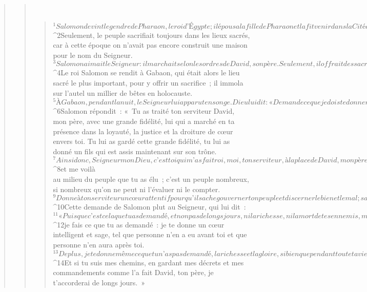 \begin{verse}
\begin{verse}
         
      \bchapter{}
      \begin{verse}
${}^{1}Salomon devint le gendre de Pharaon, le roi d’Égypte ; il épousa la fille de Pharaon et la fit venir dans la Cité de David, en attendant d’avoir achevé la construction de sa propre maison, de la maison du Seigneur et du mur d’enceinte de Jérusalem. 
${}^{2}Seulement, le peuple sacrifiait toujours dans les lieux sacrés, car à cette époque on n’avait pas encore construit une maison pour le nom du Seigneur. 
${}^{3}Salomon aimait le Seigneur : il marchait selon les ordres de David, son père. Seulement, il offrait des sacrifices dans les lieux sacrés, et y brûlait de l’encens.
      
         
${}^{4}Le roi Salomon se rendit à Gabaon, qui était alors le lieu sacré le plus important, pour y offrir un sacrifice ; il immola sur l’autel un millier de bêtes en holocauste. 
${}^{5}À Gabaon, pendant la nuit, le Seigneur lui apparut en songe. Dieu lui dit : « Demande ce que je dois te donner. » 
${}^{6}Salomon répondit : « Tu as traité ton serviteur David, mon père, avec une grande fidélité, lui qui a marché en ta présence dans la loyauté, la justice et la droiture de cœur envers toi. Tu lui as gardé cette grande fidélité, tu lui as donné un fils qui est assis maintenant sur son trône. 
${}^{7}Ainsi donc, Seigneur mon Dieu, c’est toi qui m’as fait roi, moi, ton serviteur, à la place de David, mon père ; or, je suis un tout jeune homme, ne sachant comment se comporter, 
${}^{8}et me voilà\\au milieu du peuple que tu as élu ; c’est un peuple nombreux, si nombreux qu’on ne peut ni l’évaluer ni le compter. 
${}^{9}Donne à ton serviteur un cœur attentif pour qu’il sache gouverner ton peuple et discerner le bien et le mal ; sans cela, comment gouverner ton peuple, qui est si important ? » 
${}^{10}Cette demande de Salomon plut au Seigneur, qui lui dit : 
${}^{11}« Puisque c’est cela que tu as demandé, et non pas de longs jours, ni la richesse, ni la mort de tes ennemis, mais puisque tu as demandé le discernement, l’art d’être attentif et de gouverner, 
${}^{12}je fais ce que tu as demandé : je te donne un cœur intelligent et sage, tel que personne n’en a eu avant toi et que personne n’en aura après toi. 
${}^{13}De plus, je te donne même ce que tu n’as pas demandé, la richesse et la gloire, si bien que pendant toute ta vie tu n’auras pas d’égal parmi les rois. 
${}^{14}Et si tu suis mes chemins, en gardant mes décrets et mes commandements comme l’a fait David, ton père, je t’accorderai de longs jours. » 

\end{verse}
\end{verse}
\end{verse}
